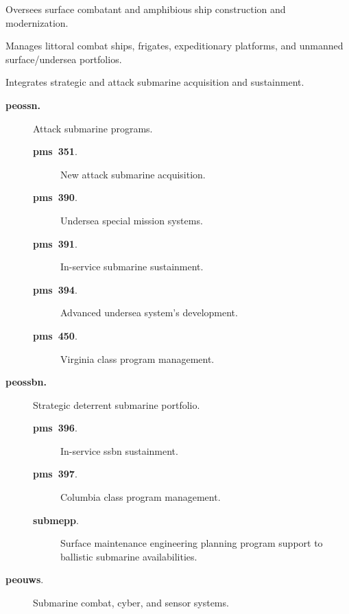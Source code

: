 \documentclass[../main.tex]{subfiles}
\begin{document}
\begin{description}
\begin{description}
          \end{description}
    \item[\textbf{\ac{peoships}.}] Oversees surface combatant and amphibious ship construction and modernization.
    \item[\textbf{\ac{peousc}.}] Manages littoral combat ships, frigates, expeditionary platforms, and unmanned surface/undersea portfolios.
    \item[\textbf{Team Submarines.}] Integrates strategic and attack submarine acquisition and sustainment.
          \begin{description}
            \item[\textbf{\ac{peossn}.}] Attack submarine programs.
                  \begin{description}
                    \item[\textbf{\ac{pms}~351}.] New attack submarine acquisition.
                    \item[\textbf{\ac{pms}~390}.] Undersea special mission systems.
                    \item[\textbf{\ac{pms}~391}.] In-service submarine sustainment.
                    \item[\textbf{\ac{pms}~394}.] Advanced undersea system's development.
                    \item[\textbf{\ac{pms}~450}.] Virginia class program management.
                  \end{description}
            \item[\textbf{\ac{peossbn}.}] Strategic deterrent submarine portfolio.
                  \begin{description}
                    \item[\textbf{\ac{pms}~396}.] In-service \ac{ssbn} sustainment.
                    \item[\textbf{\ac{pms}~397}.] Columbia class program management.
                    \item[\textbf{\ac{submepp}}.] Surface maintenance engineering planning program support to ballistic submarine availabilities.
                  \end{description}
            \item[\textbf{\ac{peouws}}.] Submarine combat, cyber, and sensor systems.
                  \begin{description}

\end{description}
\end{description}
\end{description}
\end{document}
